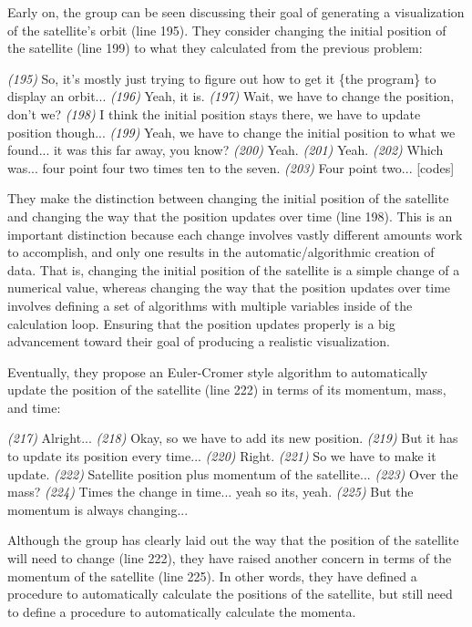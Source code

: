 \documentclass{msuphddissertation}
\begin{document}
\begin{doublespace}
Early on, the group can be seen discussing their goal of generating a visualization of the satellite's orbit (line 195).  They consider changing the initial position of the satellite (line 199) to what they calculated from the previous problem:
\begin{description}		
\SD \textit{(195)} So, it's mostly just {trying} to figure out how to get it \{the program\} to display {an orbit}...
\SA \textit{(196)} Yeah, it is.	
\SC \textit{(197)} Wait, we have to change the position, don't we?	
\SB \textit{(198)} I think {the initial} position stays there, we have to update position though...
\SC \textit{(199)} Yeah, we have to change {the initial} position to what we found... it was this far away, you know?	
\SA \textit{(200)} Yeah.		
\SB \textit{(201)} Yeah.
\SA \textit{(202)} Which was... four point four two times ten to the seven.
\SB \textit{(203)} Four point two... [codes]
\end{description}  They make the distinction between changing the initial position of the satellite and changing the way that the position updates over time (line 198).  This is an important distinction because each change involves vastly different amounts work to accomplish, and only one results in the automatic/algorithmic creation of data.  That is, changing the initial position of the satellite is a simple change of a numerical value, whereas changing the way that the position updates over time involves defining a set of algorithms with multiple variables inside of the calculation loop.  Ensuring that the position updates properly is a big advancement toward their goal of producing a realistic visualization.

Eventually, they propose an Euler-Cromer style algorithm to automatically update the position of the satellite (line 222) in terms of its momentum, mass, and time:
\begin{description}
\SB \textit{(217)} Alright...
\SB \textit{(218)} Okay, so we have to add its {new} position.
\SA \textit{(219)} But it has to update its position every time...
\SB \textit{(220)} Right.
\SA \textit{(221)} So we have to make it update.
\SB \textit{(222)} Satellite position plus momentum of the satellite...
\SA \textit{(223)} Over the mass?			
\SB \textit{(224)} Times the change in time... yeah so its, yeah.
\SB \textit{(225)} But the momentum is always changing...
\end{description}  Although the group has clearly laid out the way that the position of the satellite will need to change (line 222), they have raised another concern in terms of the momentum of the satellite (line 225).  In other words, they have defined a procedure to automatically calculate the positions of the satellite, but still need to define a procedure to automatically calculate the momenta.


\end{doublespace}
\end{document}
